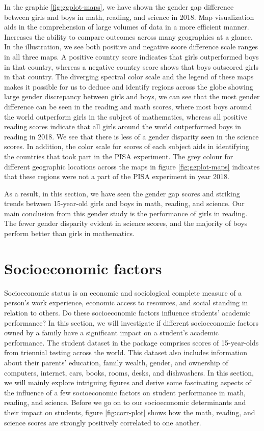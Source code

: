 In the graphic \ref{fig:ggplot-maps}, we have shown the gender gap
difference between girls and boys in math, reading, and science in 2018.
Map visualization aids in the comprehension of large volumes of data in
a more efficient manner. Increases the ability to compare outcomes
across many geographies at a glance. In the illustration, we see both
positive and negative score difference scale ranges in all three maps. A
positive country score indicates that girls outperformed boys in that
country, whereas a negative country score shows that boys outscored
girls in that country. The diverging spectral color scale and the legend
of these maps makes it possible for us to deduce and identify regions
across the globe showing large gender discrepancy between girls and
boys, we can see that the most gender difference can be seen in the
reading and math scores, where most boys around the world outperform
girls in the subject of mathematics, whereas all positive reading scores
indicate that all girls around the world outperformed boys in reading in
2018. We see that there is less of a gender disparity seen in the
science scores. In addition, the color scale for scores of each subject
aids in identifying the countries that took part in the PISA experiment.
The grey colour for different geographic locations across the maps in
figure \ref{fig:ggplot-maps} indicates that these regions were not a
part of the PISA experiment in year 2018.

As a result, in this section, we have seen the gender gap scores and
striking trends between 15-year-old girls and boys in math, reading, and
science. Our main conclusion from this gender study is the performance
of girls in reading. The fewer gender disparity evident in science
scores, and the majority of boys perform better than girls in
mathematics.

\hypertarget{socioeconomic-factors}{%
\section{Socioeconomic factors}\label{socioeconomic-factors}}

Socioeconomic status is an economic and sociological complete measure of
a person's work experience, economic access to resources, and social
standing in relation to others. Do these socioeconomic factors influence
students' academic performance? In this section, we will investigate if
different socioeconomic factors owned by a family have a significant
impact on a student's academic performance. The student dataset in the
 package comprises scores of 15-year-olds from
triennial testing across the world. This dataset also includes
information about their parents' education, family wealth, gender, and
ownership of computers, internet, cars, books, rooms, desks, and
dishwashers. In this section, we will mainly explore intriguing figures
and derive some fascinating aspects of the influence of a few
socioeconomic factors on student performance in math, reading, and
science. Before we go on to our socioeconomic determinants and their
impact on students, figure \ref{fig:corr-plot} shows how the math,
reading, and science scores are strongly positively correlated to one
another.

